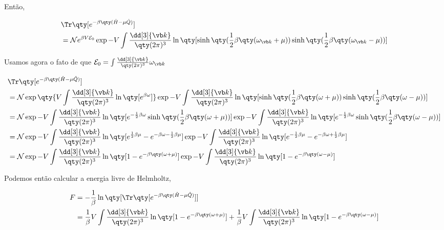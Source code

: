 \documentclass[twoside]{amsart}
\numberwithin{equation}{section}
\begin{document}
\begin{refsection}
Então,

\begin{align}
    &\Tr\qty[e^{-\beta\qty(\hat H-\mu\hat Q)}]\\
    &=\mathcal Ne^{\beta V\mathcal E_0}\exp{-V\int\frac{\dd[3]{\vb k}}{\qty(2\pi)^3}\ln\qty[\sinh\qty(\frac12\beta\qty(\omega_{\vb k}+\mu))\sinh\qty(\frac12\beta\qty(\omega_{\vb k}-\mu))]}
\end{align}

Usamos agora o fato de que $\mathcal E_0=\int\frac{\dd[3]{\vb k}}{\qty(2\pi)^3}\omega_{\vb k}$

\begin{align}
    &\Tr\qty[e^{-\beta\qty(\hat H-\mu\hat Q)}]\\
    &=\mathcal N\exp\qty{V\int\frac{\dd[3]{\vb k}}{\qty(2\pi)^3}\ln\qty[e^{\beta\omega}]}\exp{-V\int\frac{\dd[3]{\vb k}}{\qty(2\pi)^3}\ln\qty[\sinh\qty(\frac12\beta\qty(\omega+\mu))\sinh\qty(\frac12\beta\qty(\omega-\mu))]}\\
    &=\mathcal N\exp{-V\int\frac{\dd[3]{\vb k}}{\qty(2\pi)^3}\ln\qty[e^{-\frac12\beta\omega}\sinh\qty(\frac12\beta\qty(\omega+\mu))]}\exp{-V\int\frac{\dd[3]{\vb k}}{\qty(2\pi)^3}\ln\qty[e^{-\frac12\beta\omega}\sinh\qty(\frac12\beta\qty(\omega-\mu))]}\\
    &=\mathcal N\exp{-V\int\frac{\dd[3]{\vb k}}{\qty(2\pi)^3}\ln\qty[e^{\frac12\beta\mu}-e^{-\beta\omega-\frac12\beta\mu}]}\exp{-V\int\frac{\dd[3]{\vb k}}{\qty(2\pi)^3}\ln\qty[e^{-\frac12\beta\mu}-e^{-\beta\omega+\frac12\beta\mu}]}\\
    &=\mathcal N\exp{-V\int\frac{\dd[3]{\vb k}}{\qty(2\pi)^3}\ln\qty[1-e^{-\beta\qty(\omega+\mu)}]}\exp{-V\int\frac{\dd[3]{\vb k}}{\qty(2\pi)^3}\ln\qty[1-e^{-\beta\qty(\omega-\mu)}]}
\end{align}

Podemos então calcular a energia livre de Helmholtz,

\begin{align}
    F&=-\frac1\beta\ln\qty[\Tr\qty[e^{-\beta\qty(\hat H-\mu\hat Q)}]]\\
    &=\frac1\beta V\int\frac{\dd[3]{\vb k}}{\qty(2\pi)^3}\ln\qty[1-e^{-\beta\qty(\omega+\mu)}]+\frac1\beta V\int\frac{\dd[3]{\vb k}}{\qty(2\pi)^3}\ln\qty[1-e^{-\beta\qty(\omega-\mu)}]
\end{align}

\printbibliography[heading=subbibliography]
\end{refsection}

\end{document}
